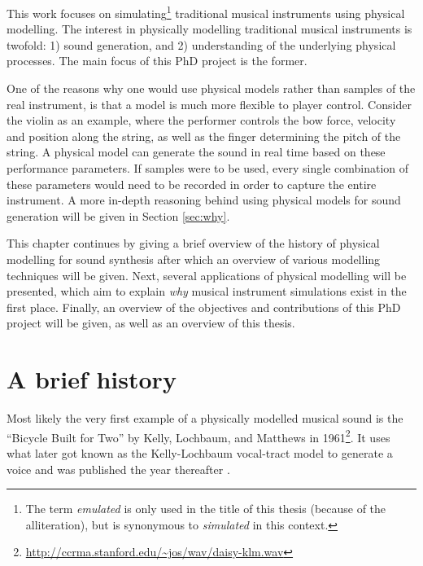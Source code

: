 This work focuses on simulating\footnote{The term \textit{emulated} is only used in the title of this thesis (because of the alliteration), but is synonymous to \textit{simulated} in this context.} traditional musical instruments using physical modelling. 
The interest in physically modelling traditional musical instruments is twofold: 1) sound generation, and 2) understanding of the underlying physical processes. The main focus of this PhD project is the former. 

One of the reasons why one would use physical models rather than samples of the real instrument, is that a model is much more flexible to player control. Consider the violin as an example, where the performer controls the bow force, velocity and position along the string, as well as the finger determining the pitch of the string. A physical model can generate the sound in real time based on these performance parameters. If samples were to be used, every single combination of these parameters would need to be recorded in order to capture the entire instrument. A more in-depth reasoning behind using physical models for sound generation will be given in Section \ref{sec:why}.

This chapter continues by giving a brief overview of the history of physical modelling for sound synthesis after which an overview of various modelling techniques will be given. Next, several applications of physical modelling will be presented, which aim to explain \textit{why} musical instrument simulations exist in the first place. Finally, an overview of the objectives and contributions of this PhD project will be given, as well as an overview of this thesis.

\section{A brief history}\label{sec:history}


Most likely the very first example of a physically modelled musical sound is the ``Bicycle Built for Two'' by Kelly, Lochbaum, and Matthews in 1961\footnote{\url{http://ccrma.stanford.edu/~jos/wav/daisy-klm.wav}}. It uses what later got known as the Kelly-Lochbaum vocal-tract model to generate a voice and was published the year thereafter \cite{Kelly1962}. 

